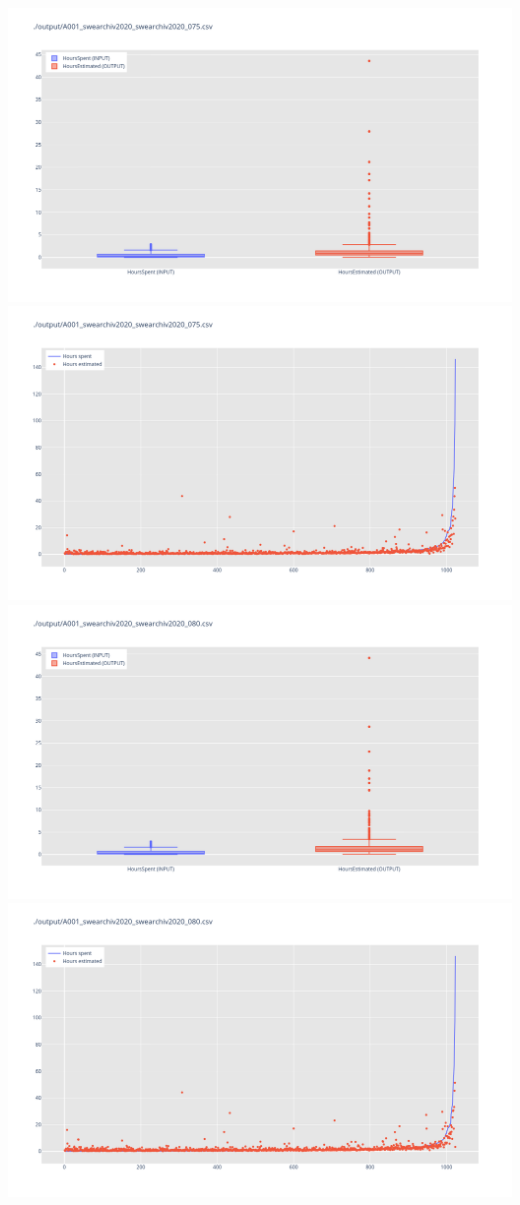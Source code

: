 \includegraphics[width=\textwidth]{Scripts/output/A001_swearchiv2020_swearchiv2020_075.csv.png}
\includegraphics[width=\textwidth]{Scripts/output/A001_swearchiv2020_swearchiv2020_075.csv.scatter.png}
\includegraphics[width=\textwidth]{Scripts/output/A001_swearchiv2020_swearchiv2020_080.csv.png}
\includegraphics[width=\textwidth]{Scripts/output/A001_swearchiv2020_swearchiv2020_080.csv.scatter.png}
